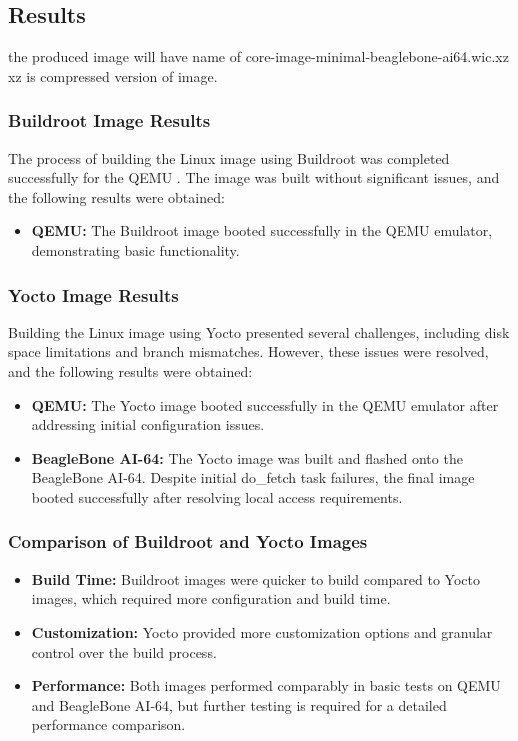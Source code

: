 \subsection{Results}
the produced image will have name of core-image-minimal-beaglebone-ai64.wic.xz
xz is compressed version of image.

\subsubsection{Buildroot Image Results}
The process of building the Linux image using Buildroot was completed successfully for the QEMU . The image was built without significant issues, and the following results were obtained:
\begin{itemize}
    \item \textbf{QEMU:} The Buildroot image booted successfully in the QEMU emulator, demonstrating basic functionality.
\end{itemize}

\subsubsection{Yocto Image Results}
Building the Linux image using Yocto presented several challenges, including disk space limitations and branch mismatches. However, these issues were resolved, and the following results were obtained:
\begin{itemize}
    \item \textbf{QEMU:} The Yocto image booted successfully in the QEMU emulator after addressing initial configuration issues.
    \item \textbf{BeagleBone AI-64:} The Yocto image was built and flashed onto the BeagleBone AI-64. Despite initial do\_fetch task failures, the final image booted successfully after resolving local access requirements.
\end{itemize}

\subsubsection{Comparison of Buildroot and Yocto Images}
\begin{itemize}
    \item \textbf{Build Time:} Buildroot images were quicker to build compared to Yocto images, which required more configuration and build time.
    \item \textbf{Customization:} Yocto provided more customization options and granular control over the build process.
    \item \textbf{Performance:} Both images performed comparably in basic tests on QEMU and BeagleBone AI-64, but further testing is required for a detailed performance comparison. 
\end{itemize}

